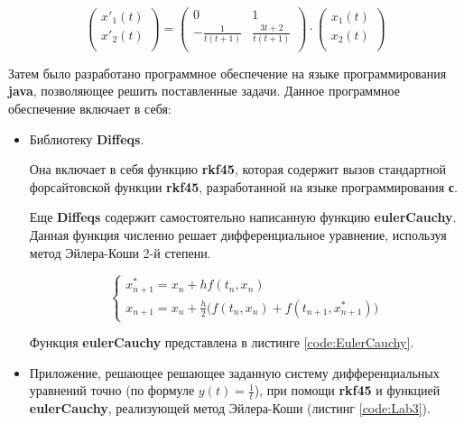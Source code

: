 \begin{displaymath}
\begin{pmatrix}
    x'_1(t) \\
    x'_2(t) \\
\end{pmatrix}
  =
\begin{pmatrix}
    0 & 1 \\
    - \frac{1}{t(t+1)} & \frac{3t+2}{t(t+1)} \\
\end{pmatrix}
\cdot
\begin{pmatrix}
    x_1(t) \\
    x_2(t) \\
\end{pmatrix}
\end{displaymath}

Затем было разработано программное обеспечение на языке программирования \textbf{java}, позволяющее решить поставленные задачи. Данное программное обеспечение включает в себя:
\begin{itemize}

\item Библиотеку \textbf{Diffeqs}.

 Она включает в себя функцию \textbf{rkf45}, которая содержит вызов стандартной форсайтовской функции \textbf{rkf45}, разработанной на языке программирования \textbf{с}.

 Еще \textbf{Diffeqs} содержит самостоятельно написанную функцию \textbf{eulerCauchy}. Данная функция численно решает дифференциальное уравнение, используя метод Эйлера-Коши 2-й степени.
 
\begin{displaymath}
\begin{cases}
	x_{n+1}^{*} = x_n + hf(t_n, x_n)
	\\
	x_{n+1} = x_n + \frac{h}{2} \Big (f(t_n, x_n) + f(t_{n+1}, x_{n+1}^{*}) \Big) 
\end{cases}
\end{displaymath} 
 
 Функция \textbf{eulerCauchy} представлена в листинге \ref{code:EulerCauchy}.

\item Приложение, решающее решающее заданную систему дифференциальных уравнений точно (по формуле $y(t) = \frac{1}{t}$), при помощи \textbf{rkf45} и функцией \textbf{eulerCauchy}, реализующей метод Эйлера-Коши (листинг \ref{code:Lab3}).

\end{itemize}

